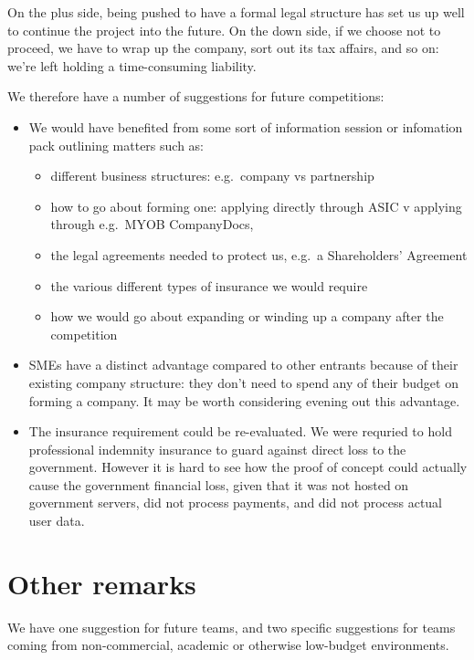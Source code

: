 \documentclass[12pt,a4paper,twosided]{article}
\begin{document}
On the plus side, being pushed to have a formal legal structure has set
us up well to continue the project into the future. On the down side, if
we choose not to proceed, we have to wrap up the company, sort out its
tax affairs, and so on: we're left holding a time-consuming liability.

We therefore have a number of suggestions for future competitions:

\begin{itemize}
\item
  We would have benefited from some sort of information session or
  infomation pack outlining matters such as:
\begin{itemize}
\item 
  different business structures: e.g.~company vs partnership
\item
  how to go about forming one: applying directly through ASIC v applying
  through e.g.~MYOB CompanyDocs,
\item
  the legal agreements needed to protect us, e.g.~a Shareholders'
  Agreement
\item
  the various different types of insurance we would require
\item
  how we would go about expanding or winding up a company after the
  competition
\end{itemize}
\item
  SMEs have a distinct advantage compared to other entrants because of
  their existing company structure: they don't need to spend any of
  their budget on forming a company. It may be worth considering evening
  out this advantage.
\item
  The insurance requirement could be re-evaluated. We were requried to
  hold professional indemnity insurance to guard against direct loss to
  the government. However it is hard to see how the proof of concept
  could actually cause the government financial loss, given that it was
  not hosted on government servers, did not process payments, and did
  not process actual user data.
\end{itemize}

\newpage
\section{Other remarks}

We have one suggestion for future teams, and two specific suggestions
for teams coming from non-commercial, academic or otherwise low-budget
environments.
\end{document}
